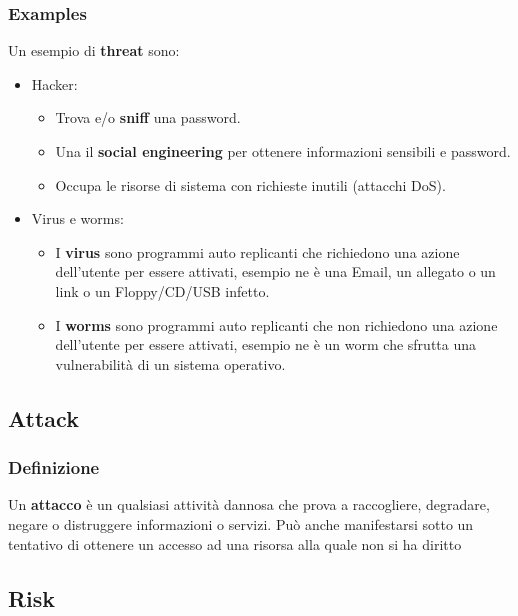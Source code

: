         \subsubsection{Examples}
                Un esempio di \textbf{threat} sono:
                \begin{itemize}
                    \item Hacker:
                        \begin{itemize}
                            \item Trova e/o \textbf{sniff} una password.
                            \item Una il \textbf{social engineering} per ottenere informazioni sensibili e password.
                            \item Occupa le risorse di sistema con richieste inutili (attacchi DoS).
                        \end{itemize}
                    \item Virus e worms:
                        \begin{itemize}
                            \item I \textbf{virus} sono programmi auto replicanti che richiedono una azione dell'utente per essere attivati, esempio ne è una Email, un allegato o un link o un Floppy/CD/USB infetto.
                            \item I \textbf{worms} sono programmi auto replicanti che non richiedono una azione dell'utente per essere attivati, esempio ne è un worm che sfrutta una vulnerabilità di un sistema operativo.
                        \end{itemize} 
                \end{itemize}
    \subsection{Attack}
        \subsubsection{Definizione} Un \textbf{attacco} è un qualsiasi attività dannosa che prova a raccogliere, degradare, negare o distruggere informazioni o servizi. Può anche manifestarsi sotto un tentativo di ottenere un accesso ad una risorsa alla quale non si ha diritto 
    \subsection{Risk}
